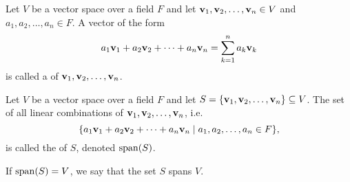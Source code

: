 \begin{defn}
Let $ V $ be a vector space over a field $ F $ and let $ \mathbf{v}_1,\mathbf{v}_2,\ldots,\mathbf{v}_n\in V $ and $ a_1,a_2,\ldots,a_n\in F $. A vector of the form
\begin{equation*}
    a_1\mathbf{v}_1+a_2\mathbf{v}_2+\cdots+a_n\mathbf{v}_n=\sum_{k=1}^n a_k\mathbf{v}_k
\end{equation*}
is called a  of $ \mathbf{v}_1,\mathbf{v}_2,\ldots,\mathbf{v}_n $.
\end{defn}

\begin{defn}
Let $ V $ be a vector space over a field $ F $ and let $ S=\{\mathbf{v}_1,\mathbf{v}_2,\ldots,\mathbf{v}_n\}\subseteq V $. The set of all linear combinations of $ \mathbf{v}_1,\mathbf{v}_2,\ldots,\mathbf{v}_n $, i.e.
\begin{equation*}
    \{a_1\mathbf{v}_1+a_2\mathbf{v}_2+\cdots+a_n\mathbf{v}_n\mid a_1,a_2,\ldots,a_n\in F\},
\end{equation*}
is called the  of $ S $, denoted $ \operatorname{span}(S) $.

If $ \operatorname{span}(S)=V $, we say that the set $ S $ spans $ V $.
\end{defn}

